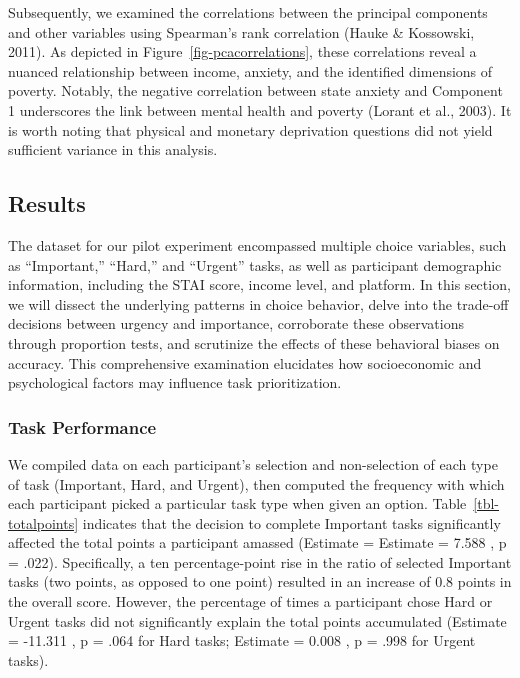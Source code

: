 \documentclass[
]{article}
\begin{document}
Subsequently, we examined the correlations between the principal
components and other variables using Spearman's rank correlation (Hauke
\& Kossowski, 2011). As depicted in Figure~\ref{fig-pcacorrelations},
these correlations reveal a nuanced relationship between income,
anxiety, and the identified dimensions of poverty. Notably, the negative
correlation between state anxiety and Component 1 underscores the link
between mental health and poverty (Lorant et al., 2003). It is worth
noting that physical and monetary deprivation questions did not yield
sufficient variance in this analysis.

\hypertarget{results}{%
\subsection{Results}\label{results}}

The dataset for our pilot experiment encompassed multiple choice
variables, such as ``Important,'' ``Hard,'' and ``Urgent'' tasks, as
well as participant demographic information, including the STAI score,
income level, and platform. In this section, we will dissect the
underlying patterns in choice behavior, delve into the trade-off
decisions between urgency and importance, corroborate these observations
through proportion tests, and scrutinize the effects of these behavioral
biases on accuracy. This comprehensive examination elucidates how
socioeconomic and psychological factors may influence task
prioritization.

\hypertarget{task-performance}{%
\subsubsection{Task Performance}\label{task-performance}}

We compiled data on each participant's selection and non-selection of
each type of task (Important, Hard, and Urgent), then computed the
frequency with which each participant picked a particular task type when
given an option. Table~\ref{tbl-totalpoints} indicates that the decision
to complete Important tasks significantly affected the total points a
participant amassed (Estimate = Estimate = 7.588 , p = .022).
Specifically, a ten percentage-point rise in the ratio of selected
Important tasks (two points, as opposed to one point) resulted in an
increase of 0.8 points in the overall score. However, the percentage of
times a participant chose Hard or Urgent tasks did not significantly
explain the total points accumulated (Estimate = -11.311 , p = .064 for
Hard tasks; Estimate = 0.008 , p = .998 for Urgent tasks).
\end{document}
